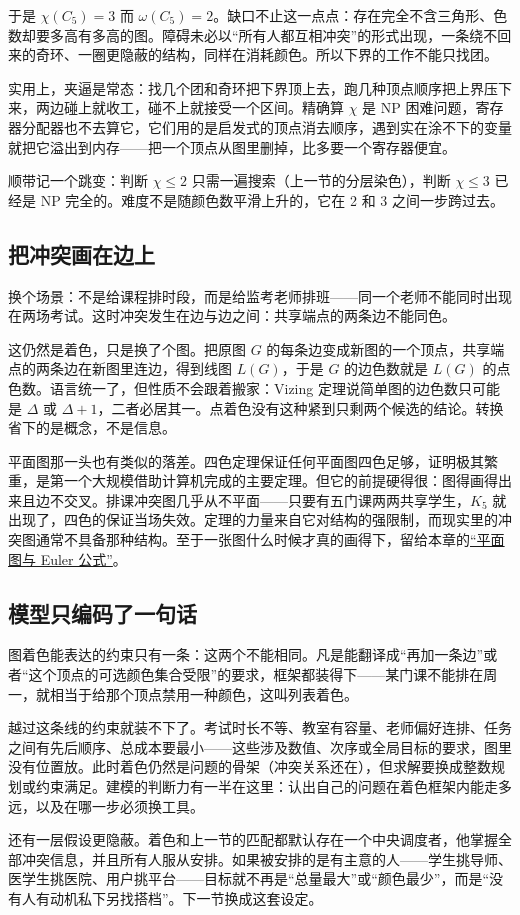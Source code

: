 于是 \(\chi(C_5)=3\) 而 \(\omega(C_5)=2\)。缺口不止这一点点：存在完全不含三角形、色数却要多高有多高的图。障碍未必以``所有人都互相冲突''的形式出现，一条绕不回来的奇环、一圈更隐蔽的结构，同样在消耗颜色。所以下界的工作不能只找团。

实用上，夹逼是常态：找几个团和奇环把下界顶上去，跑几种顶点顺序把上界压下来，两边碰上就收工，碰不上就接受一个区间。精确算 \(\chi\) 是 NP 困难问题，寄存器分配器也不去算它，它们用的是启发式的顶点消去顺序，遇到实在涂不下的变量就把它溢出到内存——把一个顶点从图里删掉，比多要一个寄存器便宜。

顺带记一个跳变：判断 \(\chi\le2\) 只需一遍搜索（上一节的分层染色），判断 \(\chi\le3\) 已经是 NP 完全的。难度不是随颜色数平滑上升的，它在 2 和 3 之间一步跨过去。

\subsection{把冲突画在边上}

换个场景：不是给课程排时段，而是给监考老师排班——同一个老师不能同时出现在两场考试。这时冲突发生在边与边之间：共享端点的两条边不能同色。

这仍然是着色，只是换了个图。把原图 \(G\) 的每条边变成新图的一个顶点，共享端点的两条边在新图里连边，得到线图 \(L(G)\)，于是 \(G\) 的边色数就是 \(L(G)\) 的点色数。语言统一了，但性质不会跟着搬家：Vizing 定理说简单图的边色数只可能是 \(\Delta\) 或 \(\Delta+1\)，二者必居其一。点着色没有这种紧到只剩两个候选的结论。转换省下的是概念，不是信息。

平面图那一头也有类似的落差。四色定理保证任何平面图四色足够，证明极其繁重，是第一个大规模借助计算机完成的主要定理。但它的前提硬得很：图得画得出来且边不交叉。排课冲突图几乎从不平面——只要有五门课两两共享学生，\(K_5\) 就出现了，四色的保证当场失效。定理的力量来自它对结构的强限制，而现实里的冲突图通常不具备那种结构。至于一张图什么时候才真的画得下，留给本章的\hyperref[sec:04-Discrete-Mathematics/03-Graph-Theory/09]{``平面图与 Euler 公式''}。

\subsection{模型只编码了一句话}

图着色能表达的约束只有一条：这两个不能相同。凡是能翻译成``再加一条边''或者``这个顶点的可选颜色集合受限''的要求，框架都装得下——某门课不能排在周一，就相当于给那个顶点禁用一种颜色，这叫列表着色。

越过这条线的约束就装不下了。考试时长不等、教室有容量、老师偏好连排、任务之间有先后顺序、总成本要最小——这些涉及数值、次序或全局目标的要求，图里没有位置放。此时着色仍然是问题的骨架（冲突关系还在），但求解要换成整数规划或约束满足。建模的判断力有一半在这里：认出自己的问题在着色框架内能走多远，以及在哪一步必须换工具。

还有一层假设更隐蔽。着色和上一节的匹配都默认存在一个中央调度者，他掌握全部冲突信息，并且所有人服从安排。如果被安排的是有主意的人——学生挑导师、医学生挑医院、用户挑平台——目标就不再是``总量最大''或``颜色最少''，而是``没有人有动机私下另找搭档''。下一节换成这套设定。
